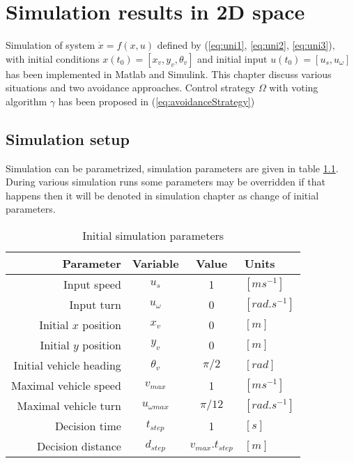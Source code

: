 \chapter{Simulation results in 2D space}
Simulation of system $\dot{x}=f(x,u)$ defined by (\ref{eq:uni1}, \ref{eq:uni2}, \ref{eq:uni3}), with initial conditions $x(t_0)=[x_v, y_v, \theta_v]$ and initial input $u(t_0)=[u_s,u_{\omega}]$ has been implemented in Matlab  and Simulink. This chapter discuss various situations and two avoidance approaches. Control strategy $\Omega$ with voting algorithm $\gamma$ has been proposed in (\ref{eq:avoidanceStrategy})

\section{Simulation setup}
Simulation can be parametrized, simulation parameters are given in table \ref{tab:simulationparameterss}. During various simulation runs some parameters may be overridden if that happens then it will be denoted in simulation chapter as change of initial parameters. 
\begin{table}[H]
    \centering
    \begin{tabular}{|r|c|c|l|}
        \hline
        Parameter & Variable & Value & Units \\
        \hline
        \hline
        Input speed & $u_s$ & 1 & $[ms^{-1}]$ \\
        \hline
        Input turn & $u_{\omega}$ & 0 & $ [rad.s^{-1}] $ \\
        \hline
        Initial $x$ position & $x_v$& 0& $[m]$ \\
        \hline
        Initial $y$ position & $y_v$& 0& $[m]$ \\
        \hline
        Initial vehicle heading & $\theta_v$& $\pi/2$ & $[rad]$ \\
        \hline
        Maximal vehicle speed & $v_{max}$ & 1 & $[ms^{-1}]$ \\ 
        \hline
        Maximal vehicle turn & $u_{\omega max}$ & $\pi/12$ & $ [rad.s^{-1}] $ \\
        \hline
        Decision time & $t_{step}$ & 1 & $[s]$\\
        \hline
        Decision distance & $d_{step}$ & $v_{max}.t_{step}$ & $[m]$\\
        \hline
    \end{tabular}
    \caption{Initial simulation parameters}
    \label{tab:simulationparameterss}  
\end{table}


